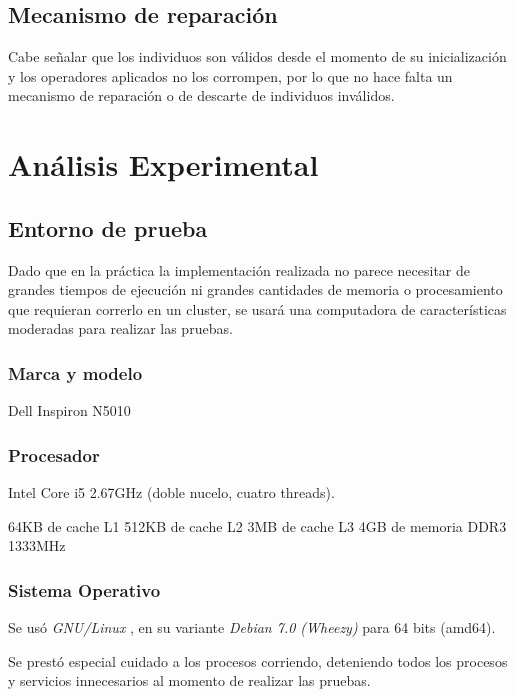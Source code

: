 \documentclass[journal]{IEEEtran}
\begin{document}
\subsection{Mecanismo de reparación}

Cabe señalar que los individuos son válidos desde el momento de su inicialización y los operadores aplicados no los corrompen, por lo que no hace falta un mecanismo de reparación o de descarte de individuos inválidos.

\section{Análisis Experimental}

\subsection{Entorno de prueba}

Dado que en la práctica la implementación realizada no parece necesitar de grandes tiempos de ejecución ni grandes cantidades de memoria o procesamiento que requieran correrlo en un cluster, se usará una computadora de características moderadas para realizar las pruebas.\\

\subsubsection{Marca y modelo}

Dell Inspiron N5010

\subsubsection{Procesador}

Intel Core i5 2.67GHz (doble nucelo, cuatro threads).

64KB de cache L1
512KB de cache L2
3MB de cache L3
4GB de memoria DDR3 1333MHz

\subsubsection{Sistema Operativo}

Se usó \emph{GNU/Linux} \cite{gnu} \cite{linux}, en su variante \emph{Debian 7.0 (Wheezy)} \cite{debian:stable} para 64 bits (amd64).

Se prestó especial cuidado a los procesos corriendo, deteniendo todos los procesos y servicios innecesarios al momento de realizar las pruebas.
\end{document}
